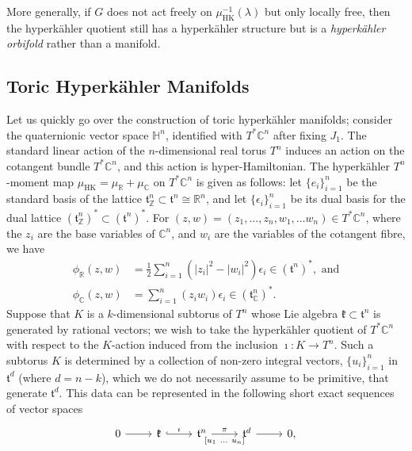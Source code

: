 \documentclass{amsart}
\newcommand{\ra}{\rightarrow}
\newcommand{\e}{\epsilon}
\newcommand{\RR}{\mathbb{R}}
\newcommand{\CC}{\mathbb{C}}
\newcommand{\ZZ}{\mathbb{Z}}
\newcommand{\HH}{\mathbb{H}}
\newcommand{\mfk}{\mathfrak{k}}
\newcommand{\mft}{\mathfrak{t}}
\DeclareMathOperator{\HK}{HK}
\begin{document}
	More generally, if $G$ does not act freely on $\mu_{\HK}^{-1}(\lambda)$ but only locally free, then the hyperk\"ahler quotient still has a hyperk\"ahler structure but is a \emph{hyperk\"ahler orbifold} rather than a manifold.
	
	
	
	\subsection{Toric Hyperk\"ahler Manifolds}
	
	Let us quickly go over the construction of toric hyperk\"ahler manifolds; consider the quaternionic vector space $\HH^{n}$, identified with $T^{\ast}\CC^{n}$ after fixing $J_{1}$. The standard linear action of the $n$-dimensional real torus $T^{n}$ induces an action on the cotangent bundle $T^{\ast}\CC^{n}$, and this action is hyper-Hamiltonian. The hyperk\"ahler $T^{n}$-moment map $\mu_{\HK} = \mu_{\RR} + \mu_{\CC}$ on $T^{\ast}\CC^{n}$ is given as follows: let $\{e_{i}\}_{i=1}^{n}$ be the standard basis of the lattice $\mft_{\ZZ}^{n} \subset \mft^{n} \cong \RR^{n}$, and let $\{\e_{i}\}_{i=1}^{n}$ be its dual basis for the dual lattice $(\mft_{\ZZ}^{n})^{\ast} \subset (\mft^{n})^{\ast}$. For $(z,w) = (z_{1},\ldots, z_{n}, w_{1},\ldots w_{n}) \in T^{\ast}\CC^{n}$, where the $z_{i}$ are the base variables of $\CC^{n}$, and $w_{i}$ are the variables of the cotangent fibre, we have
	\begin{align*}%
		\phi_{\RR}(z,w) &= \frac{1}{2} \sum_{i=1}^{n} \left( |z_{i}|^2 - |w_{i}|^2 \right) \e_{i} \in (\mft^{n})^{\ast},
		\mbox{ and}\\
		\phi_{\CC}(z,w) &= \sum_{i=1}^{n} (z_{i} w_{i}) \e_{i} \in (\mft_{\CC}^{n})^{\ast}.
	\end{align*}
	Suppose that $K$ is a $k$-dimensional subtorus of $T^{n}$ whose Lie algebra $\mfk \subset \mft^{n}$ is generated by rational vectors; we wish to take the hyperk\"ahler quotient of $T^{\ast}\CC^{n}$ with respect to the $K$-action induced from the inclusion $\imath : K \ra T^{n}$. Such a subtorus $K$ is determined by a collection of non-zero integral vectors, $\{u_{i}\}_{i=1}^{n}$ in $\mft^{d}$ (where $d = n - k$), which we do not necessarily assume to be primitive, that generate $\mft^{d}$. This data can be represented in the following short exact sequences of vector spaces
	\[
		\begin{tikzcd}[ampersand replacement=\&]
			0 \ar[r] \&
			\mfk \ar[r, hook, "\imath"] \& \mft^{n} \arrow{r}{\pi}[swap]{[u_{1}\ \ldots \ u_{n}]} \& \mft^{d} \ar[r] \& 0,
		\end{tikzcd}
	\]
\end{document}
